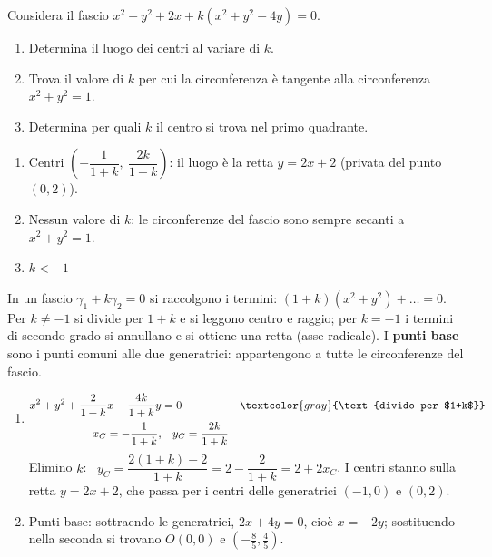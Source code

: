 
\begin{question}[ID=6.5, subtitle={Fascio $x^2+y^2+2x+k(x^2+y^2-4y)=0$: luogo dei centri}, difficulty=difficile, tags={fasci, circonferenze}]
Considera il fascio $x^2+y^2+2x+k(x^2+y^2-4y)=0$.
\begin{enumerate}
\item Determina il luogo dei centri al variare di $k$.
\item Trova il valore di $k$ per cui la circonferenza è tangente alla circonferenza $x^2+y^2=1$.
\item Determina per quali $k$ il centro si trova nel primo quadrante.
\end{enumerate}
\begin{solution}
\begin{enumerate}
    \item Centri $\left(-\dfrac{1}{1+k},\ \dfrac{2k}{1+k}\right)$: il luogo è la retta $y=2x+2$ (privata del punto $(0,2)$).
    \item Nessun valore di $k$: le circonferenze del fascio sono sempre secanti a $x^2+y^2=1$.
    \item $k<-1$
\end{enumerate}
\end{solution}
\begin{explanation}
In un fascio $\gamma_1+k\gamma_2=0$ si raccolgono i termini: $(1+k)(x^2+y^2)+\dots=0$. Per $k\neq-1$ si divide per $1+k$ e si leggono centro e raggio; per $k=-1$ i termini di secondo grado si annullano e si ottiene una retta (asse radicale). I \textbf{punti base} sono i punti comuni alle due generatrici: appartengono a tutte le circonferenze del fascio.
\begin{enumerate}
    \item \[\begin{aligned}
    x^2+y^2+\dfrac{2}{1+k}x-\dfrac{4k}{1+k}y &= 0 && \textcolor{gray}{\text{divido per $1+k$}}\\
    x_C=-\dfrac{1}{1+k}, &\quad y_C=\dfrac{2k}{1+k}
    \end{aligned}\]
    Elimino $k$: \ $y_C=\dfrac{2(1+k)-2}{1+k}=2-\dfrac{2}{1+k}=2+2x_C$. I centri stanno sulla retta $y=2x+2$, che passa per i centri delle generatrici $(-1,0)$ e $(0,2)$.
    \item Punti base: sottraendo le generatrici, $2x+4y=0$, cioè $x=-2y$; sostituendo nella seconda si trovano $O(0,0)$ e $\left(-\tfrac85,\tfrac45\right)$. \\

\end{enumerate}
\end{explanation}
\end{question}
